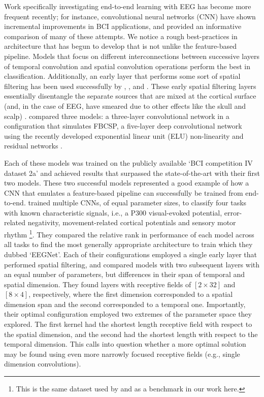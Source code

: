 \documentclass[utf8]{frontiersSCNS} %
\begin{document}

Work specifically investigating end-to-end learning with EEG has become more frequent recently; for instance, convolutional neural networks (CNN) have shown incremental improvements in BCI applications, and \cite{Schirrmeister2017} provided an informative comparison of many of these attempts. We notice a rough best-practices in architecture that has begun to develop that is not unlike the feature-based pipeline. Models that focus on different interconnections between successive layers of temporal convolution and spatial convolution operations perform the best in classification. Additionally, an early layer that performs some sort of spatial filtering has been used successfully by \cite{Lawhern2017}, \cite{Sun}, and \cite{Schirrmeister2017}. These early spatial filtering layers essentially disentangle the separate sources that are mixed at the cortical surface (and, in the case of EEG, have smeared due to other effects like the skull and scalp) \cite{ElectricFieldsOfTheBrain_ch5and6}. \cite{Schirrmeister2017} compared three models: a three-layer convolutional network in a configuration that simulates FBCSP, a five-layer deep convolutional network using the recently developed exponential linear unit (ELU) non-linearity \cite{Clevert} and residual networks \cite{He2015a}. 

Each of these models was trained on the publicly available `BCI competition IV dataset 2a' and achieved results that surpassed the state-of-the-art with their first two models. These two successful models represented a good example of how a CNN that emulates a feature-based pipeline can successfully be trained from end-to-end. \cite{Lawhern2017} trained multiple CNNs, of equal parameter sizes, to classify four tasks with known characteristic signals, i.e., a P300 visual-evoked potential, error-related negativity, movement-related cortical potentials and sensory motor rhythm \footnote{This is the same dataset used by \cite{Schirrmeister2017} and as a benchmark in our work here.}. They compared the relative rank in performance of each model across all tasks to find the most generally appropriate architecture to train which they dubbed `EEGNet'. Each of their configurations employed a single early layer that performed spatial filtering, and compared models with two subsequent layers with an equal number of parameters, but differences in their span of temporal and spatial dimension. They found layers with receptive fields of $[2 \times 32]$ and $[8 \times 4]$, respectively, where the first dimension corresponded to a spatial dimension span and the second corresponded to a temporal one. Importantly, their optimal configuration employed two extremes of the parameter space they explored. The first kernel had the shortest length receptive field with respect to the spatial dimension, and the second had the shortest length with respect to the temporal dimension. This calls into question whether a more optimal solution may be found using even more narrowly focused receptive fields (e.g., single dimension convolutions). 
\end{document}
